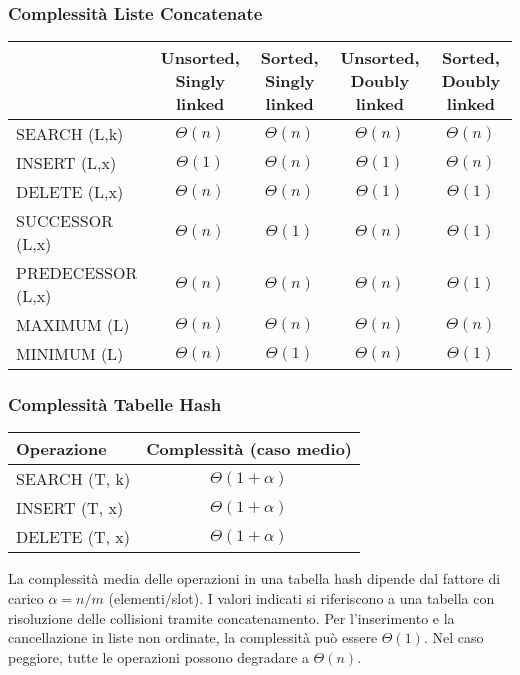 \subsubsection{Complessità Liste Concatenate}

\begin{tabular}{|l|c|c|c|c|}
\hline
 & \shortstack{Unsorted, \\ Singly linked} & \shortstack{Sorted, \\ Singly linked} & \shortstack{Unsorted, \\ Doubly linked} & \shortstack{Sorted, \\ Doubly linked} \\
\hline
SEARCH (L,k) & $\Theta(n)$ & $\Theta(n)$ & $\Theta(n)$ & $\Theta(n)$ \\
\hline
INSERT (L,x) & $\Theta(1)$ & $\Theta(n)$ & $\Theta(1)$ & $\Theta(n)$ \\
\hline
DELETE (L,x) & $\Theta(n)$ & $\Theta(n)$ & $\Theta(1)$ & $\Theta(1)$ \\
\hline
SUCCESSOR (L,x) & $\Theta(n)$ & $\Theta(1)$ & $\Theta(n)$ & $\Theta(1)$ \\
\hline
PREDECESSOR (L,x) & $\Theta(n)$ & $\Theta(n)$ & $\Theta(n)$ & $\Theta(1)$ \\
\hline
MAXIMUM (L) & $\Theta(n)$ & $\Theta(n)$ & $\Theta(n)$ & $\Theta(n)$ \\
\hline
MINIMUM (L) & $\Theta(n)$ & $\Theta(1)$ & $\Theta(n)$ & $\Theta(1)$ \\
\hline
\end{tabular}

\subsubsection{Complessità Tabelle Hash}

\begin{tabular}{|l|c|}
\hline
\textbf{Operazione} & \textbf{Complessità (caso medio)} \\
\hline
SEARCH (T, k) & $\Theta(1+\alpha)$ \\
\hline
INSERT (T, x) & $\Theta(1+\alpha)$ \\
\hline
DELETE (T, x) & $\Theta(1+\alpha)$ \\
\hline
\end{tabular}

\vspace{2mm}
\footnotesize{La complessità media delle operazioni in una tabella hash dipende dal fattore di carico $\alpha = n/m$ (elementi/slot). I valori indicati si riferiscono a una tabella con risoluzione delle collisioni tramite concatenamento. Per l'inserimento e la cancellazione in liste non ordinate, la complessità può essere $\Theta(1)$. Nel caso peggiore, tutte le operazioni possono degradare a $\Theta(n)$.}
